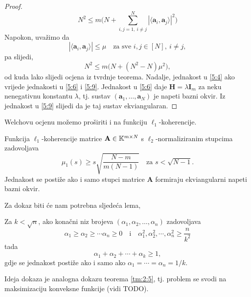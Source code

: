 \documentclass[a4paper,twoside,12pt]{memoir} %
\newcommand{\vect}[1]{\mathbf{#1}}
\renewcommand{\vec}{\vect}
\begin{document}
\begin{proof}
    \begin{equation}\label{5:8}
        N^2 \leq m \big( N + \sum_{i,j = 1,\ i \neq j}^N |\langle \vec a_i, \vec a_j \rangle|^2 \big)
    \end{equation}
    Napokon, uva\v{z}imo da 
    \begin{equation}\label{5:9}
        |\langle \vec a_i, \vec a_j \rangle| \leq \mu \quad \text{za sve }i,j \in [N],\ i \neq j,
    \end{equation}
    pa slijedi,
    \begin{equation*}
        N^2 \leq m \big( N + (N^2 - N)\mu^2 \big), 
    \end{equation*}
    od kuda lako slijedi ocjena iz tvrdnje teorema.
    Nadalje, jednakost u \eqref{5:4} ako vrijede jednakosti u \eqref{5:6} i \eqref{5:9}. Jednakost u \eqref{5:6} daje $\vec H = \lambda \vec I_m$ za neku nenegativnu konstantu $\lambda$, tj. sustav $(\vec a_1, \dots, \vec a_N)$ je napeti bazni okvir. Iz jednakost u \eqref{5:9} slijedi da je taj sustav ekviangularan.
\end{proof}

Welchovu ocjenu mo\v{z}emo pro\v{s}iriti i na funkciju $\ell_1$-koherencije.
\begin{thm}\label{tm:5:8}
    Funkcija $\ell_1$-koherencije matrice $\vec A \in \K^{m \times N}$ s $\ell_2$-normaliziranim stupcima zadovoljava 
    \begin{equation}\label{5:10}
        \mu_1(s) \geq s \sqrt{\frac{N-m}{m(N-1)}}\quad \text{za } s < \sqrt{N - 1}.
    \end{equation}
    Jednakost se posti\v{z}e ako i samo stupci matrice $\vec A$ formiraju ekviangularni napeti bazni okvir.
\end{thm}
Za dokaz biti \'ce nam potrebna sljede\'ca lema,
\begin{lem}\label{lem:5:9}
    Za $k < \sqrt{n}$, ako kona\v{c}ni niz brojeva $(\alpha_1, \alpha_2, \dots, \alpha_n)$ zadovoljava
    \begin{equation*}
        \alpha_1 \geq \alpha_2 \geq \cdots \alpha_n \geq 0 \quad \text{i} \quad \alpha_1^2,\alpha_2^2, \cdots,\alpha_n^2 \geq \frac{n}{k^2} 
    \end{equation*}
    tada
    \begin{equation*}
        \alpha_1 + \alpha_2 + \cdots + \alpha_k \geq 1, 
    \end{equation*}
    gdje se jednakost posti\v{z}e ako i samo ako $\alpha_1 = \cdots = \alpha_n = 1/k$.
\end{lem}
Ideja dokaza je analogna dokazu teorema \ref{tm:2:5}, tj. problem se svodi na maksimizaciju konveksne funkcije (vidi TODO).
\end{document}
